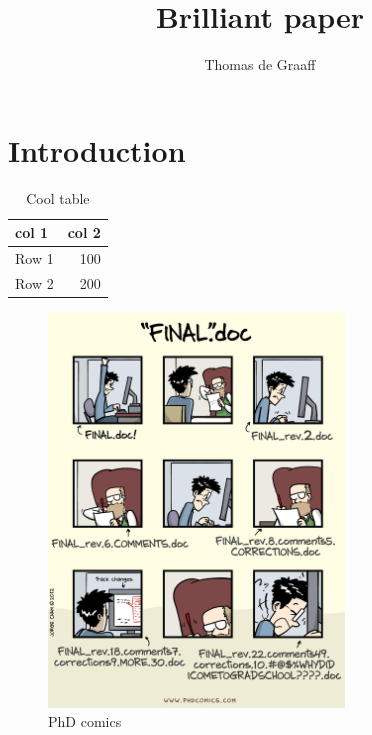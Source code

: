 \documentclass[a4paper]{scrartcl}
\title{Brilliant paper}
\author{Thomas de Graaff}
\begin{document}
\maketitle

\begin{abstract}
\lipsum[1]
\end{abstract}

\section{Introduction}

\begin{table}[h!]
	\caption{Cool table}
	\center
	\begin{tabular}{lr}
		\toprule
		col 1 & col 2 \\
		\midrule
		Row 1 & 100 \\
		Row 2 & 200 \\
		\bottomrule
	\end{tabular}
\end{table}

\lipsum[2-4]

\begin{figure}[h!]
	\center
	\includegraphics[width=0.7\textwidth]{../../../slides/fig/phdcomic}
	\caption{PhD comics}
\end{figure}
\end{document}
